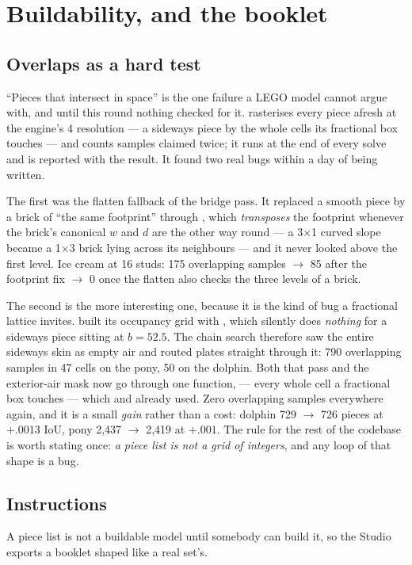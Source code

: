 \section{Buildability, and the booklet}\label{sec:booklet}
\subsection{Overlaps as a hard test}
``Pieces that intersect in space'' is the one failure a LEGO model cannot argue with, and until this round nothing checked for it.
 rasterises every piece afresh at the engine's 4\ldu{} resolution --- a sideways piece by the whole cells its
fractional box touches --- and counts samples claimed twice; it runs at the end of every solve and is reported with the result. It
found two real bugs within a day of being written.

The first was the flatten fallback of the bridge pass. It replaced a smooth piece by a brick of ``the same footprint'' through
, which \emph{transposes} the footprint whenever the brick's canonical $w$ and
$d$ are the other way round --- a 3$\times$1 curved slope became a 1$\times$3 brick lying across its neighbours --- and it never
looked above the first level. Ice cream at 16 studs: 175 overlapping samples $\to$ 85 after the footprint fix $\to$ 0 once the
flatten also checks the three levels of a brick.

The second is the more interesting one, because it is the kind of bug a fractional lattice invites.  built its
occupancy grid with , which silently does \emph{nothing} for a sideways piece sitting at
$b = 52.5$. The chain search therefore saw the entire sideways skin as empty air and routed plates straight through it: 790
overlapping samples in 47 cells on the pony, 50 on the dolphin. Both that pass and the exterior-air mask now go through one
function,  --- every whole cell a fractional box touches --- which  and  already
used. Zero overlapping samples everywhere again, and it is a small \emph{gain} rather than a cost: dolphin 729 $\to$ 726 pieces at
$+.0013$ IoU, pony 2,437 $\to$ 2,419 at $+.001$. The rule for the rest of the codebase is worth stating once: \emph{a piece list is
not a grid of integers}, and any loop of that shape is a bug.

\subsection{Instructions}
A piece list is not a buildable model until somebody can build it, so the Studio exports a booklet shaped like a real set's.

